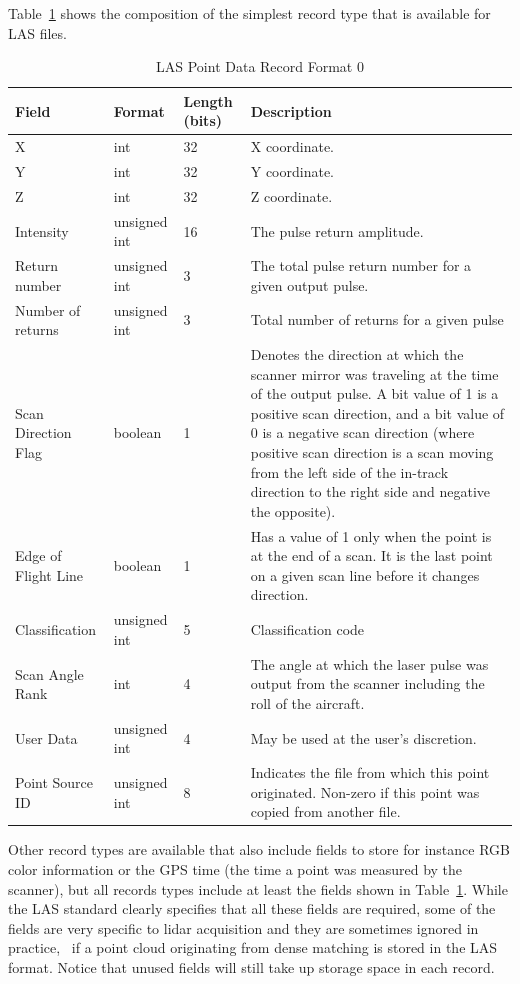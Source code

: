 Table~\ref{tab:las-record} shows the composition of the simplest record type that is available for LAS files.
\begin{table}
  \centering
  \small
  \begin{tabular}{l|l|l|p{7cm}}
    Field & Format & Length (bits) & Description\\ \midrule
    X & int & 32 & X coordinate. \\ 
    Y & int & 32 & Y coordinate. \\ 
    Z & int & 32 & Z coordinate. \\ 
    Intensity & unsigned int & 16 & The pulse return amplitude. \\ 
    Return number & unsigned int & 3 &  The total pulse return number for a given output pulse. \\ 
    Number of returns & unsigned int & 3 & Total number of returns for a given pulse \\ 
    Scan Direction Flag & boolean & 1 & Denotes the direction at which the scanner mirror was traveling at the time of the output pulse. A bit value of 1 is a positive scan direction, and a bit value of 0 is a negative scan direction (where positive scan direction is a scan moving from the left side of the in-track direction to the right side and negative the opposite).  \\ 
    Edge of Flight Line & boolean & 1 & Has a value of 1 only when the point is at the end of a scan. It is the last point on a given scan line before it changes direction. \\ 
    Classification & unsigned int & 5 & Classification code \\ 
    Scan Angle Rank & int & 4 & The angle at which the laser pulse was output from the scanner including the roll of the aircraft. \\ 
    User Data & unsigned int & 4 & May be used at the user's discretion. \\ 
    Point Source ID & unsigned int & 8 & Indicates the file from which this point originated. Non-zero if this point was copied from another file.
  \end{tabular}
\caption{LAS Point Data Record Format 0}
\label{tab:las-record}
\end{table}
Other record types are available that also include fields to store for instance  RGB color information or the GPS time (the time a point was measured by the scanner), but all records types include at least the fields shown in Table~\ref{tab:las-record}.
While the LAS standard clearly specifies that all these fields are required, some of the fields are very specific to lidar acquisition and they are sometimes ignored in practice, \eg\ if a point cloud originating from dense matching is stored in the LAS format. 
Notice that unused fields will still take up storage space in each record.

